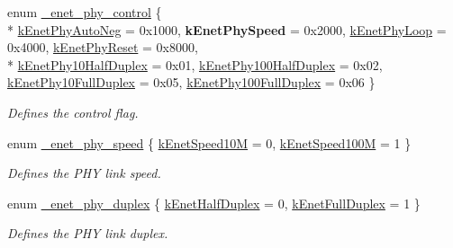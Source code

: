 \begin{DoxyCompactItemize}
\item 
enum \hyperlink{group__phy__driver_ga6a73ce8fecc8d411b87534a1c598f45b}{\+\_\+enet\+\_\+phy\+\_\+control} \{ \\*
\hyperlink{group__phy__driver_gga6a73ce8fecc8d411b87534a1c598f45ba1091ee7adc484549a23d68f0a5020128}{k\+Enet\+Phy\+Auto\+Neg} = 0x1000, 
{\bfseries k\+Enet\+Phy\+Speed} = 0x2000, 
\hyperlink{group__phy__driver_gga6a73ce8fecc8d411b87534a1c598f45ba91b73217772be0b07fa7663a6881a746}{k\+Enet\+Phy\+Loop} = 0x4000, 
\hyperlink{group__phy__driver_gga6a73ce8fecc8d411b87534a1c598f45baaae99db895b614781a1b5dab051ed0d5}{k\+Enet\+Phy\+Reset} = 0x8000, 
\\*
\hyperlink{group__phy__driver_gga6a73ce8fecc8d411b87534a1c598f45ba9ff0311d0d861d3511e1346e954cd342}{k\+Enet\+Phy10\+Half\+Duplex} = 0x01, 
\hyperlink{group__phy__driver_gga6a73ce8fecc8d411b87534a1c598f45ba0a0e94496ab16437578db72a2331f427}{k\+Enet\+Phy100\+Half\+Duplex} = 0x02, 
\hyperlink{group__phy__driver_gga6a73ce8fecc8d411b87534a1c598f45ba0548ba1204aa54cc96f23b60de54b1d5}{k\+Enet\+Phy10\+Full\+Duplex} = 0x05, 
\hyperlink{group__phy__driver_gga6a73ce8fecc8d411b87534a1c598f45ba32921ffa56891958163e77f2e14fcc28}{k\+Enet\+Phy100\+Full\+Duplex} = 0x06
 \}\begin{DoxyCompactList}\small\item\em Defines the control flag. \end{DoxyCompactList}
\item 
enum \hyperlink{group__phy__driver_ga123897a64fd9524efbc2d786c8a8a503}{\+\_\+enet\+\_\+phy\+\_\+speed} \{ \hyperlink{group__phy__driver_gga123897a64fd9524efbc2d786c8a8a503a6e408c8061cc2d9bf67a09c1e724f1f6}{k\+Enet\+Speed10M} = 0, 
\hyperlink{group__phy__driver_gga123897a64fd9524efbc2d786c8a8a503a4292079df8c723c0002aa12f7a1401d8}{k\+Enet\+Speed100M} = 1
 \}\begin{DoxyCompactList}\small\item\em Defines the P\+HY link speed. \end{DoxyCompactList}
\item 
enum \hyperlink{group__phy__driver_ga25ad8ca957c7a3088e2d40fbe61decd9}{\+\_\+enet\+\_\+phy\+\_\+duplex} \{ \hyperlink{group__phy__driver_gga25ad8ca957c7a3088e2d40fbe61decd9a42ed52741468d5d6b4f4d997a6bf24b0}{k\+Enet\+Half\+Duplex} = 0, 
\hyperlink{group__phy__driver_gga25ad8ca957c7a3088e2d40fbe61decd9aafc839b3008cbdaa41d14f2e1433fd14}{k\+Enet\+Full\+Duplex} = 1
 \}\begin{DoxyCompactList}\small\item\em Defines the P\+HY link duplex. \end{DoxyCompactList}

\end{DoxyCompactItemize}
